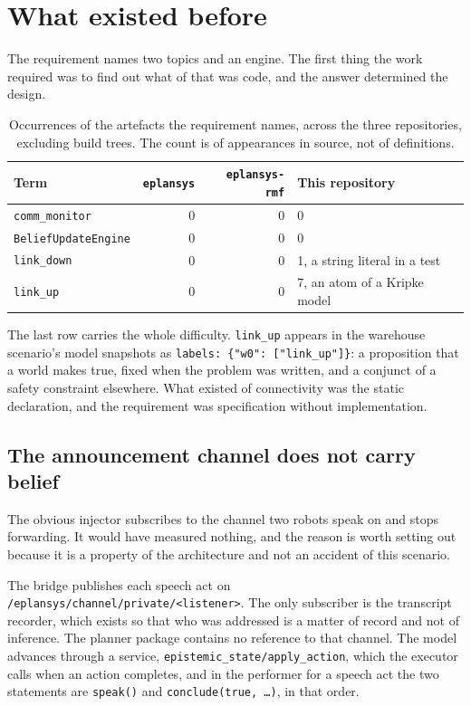 \documentclass[11pt,a4paper]{article}
\theoremstyle{definition}
\newcommand{\code}[1]{\texttt{\small #1}}
\begin{document}
\section{What existed before}
\label{sec:before}

The requirement names two topics and an engine. The first thing the work
required was to find out what of that was code, and the answer determined the
design.

\begin{table}[H]
\centering\small
\caption{Occurrences of the artefacts the requirement names, across the three
repositories, excluding build trees. The count is of appearances in source, not
of definitions.}
\label{tab:inventory}
\begin{tabular}{@{}lrrl@{}}
\toprule
\textbf{Term} & \textbf{\code{eplansys}} & \textbf{\code{eplansys-rmf}} &
\textbf{This repository} \\
\midrule
\code{comm\_monitor}       & 0 & 0 & 0 \\
\code{BeliefUpdateEngine}  & 0 & 0 & 0 \\
\code{link\_down}          & 0 & 0 & 1, a string literal in a test \\
\code{link\_up}            & 0 & 0 & 7, an atom of a Kripke model \\
\bottomrule
\end{tabular}
\end{table}

The last row carries the whole difficulty. \code{link\_up} appears in the
warehouse scenario's model snapshots as
\code{labels: \{"w0": ["link\_up"]\}}: a proposition that a world makes true,
fixed when the problem was written, and a conjunct of a safety constraint
elsewhere. What existed of connectivity was the static declaration, and the
requirement was specification without implementation.

\subsection{The announcement channel does not carry belief}
\label{sec:channel}

The obvious injector subscribes to the channel two robots speak on and stops
forwarding. It would have measured nothing, and the reason is worth setting out
because it is a property of the architecture and not an accident of this
scenario.

The bridge publishes each speech act on
\code{/eplansys/channel/private/<listener>}. The only subscriber is the
transcript recorder, which exists so that who was addressed is a matter of
record and not of inference. The planner package contains no reference to
that channel. The model advances through a service,
\code{epistemic\_state/apply\_action}, which the executor calls when an action
completes, and in the performer for a speech act the two statements are
\code{speak()} and \code{conclude(true, \ldots)}, in that order.
\end{document}
